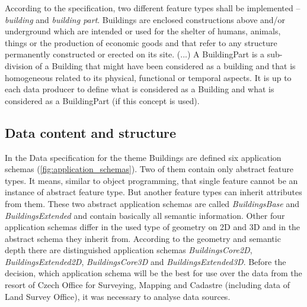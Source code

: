 \documentclass[eprint]{actapoly}
\begin{document}
According to the specification, two different feature types shall be implemented -- \textit{building} and \textit{building part}. Buildings are enclosed constructions above and/or underground which are intended or used for the shelter of humans, animals, things or the production of economic goods and that refer to any structure permanently constructed or erected on its site. (...) A BuildingPart is a sub-division of a Building that might have been considered as a building and that is homogeneous related to its physical, functional or temporal aspects. It is up to each data producer to define what is considered as a Building and what is considered as a BuildingPart (if this concept is used). \cite{Data Specification on Buildings v3.0 - http://inspire.ec.europa.eu/documents/Data_Specifications/INSPIRE_DataSpecification_BU_v3.0.pdf}

\subsection{Data content and structure}
\label{sec:content}

In the Data specification for the theme Buildings are defined six application schemas (\ref{fig:application_schemas}). Two of them contain only abstract feature types. It means, similar to object programming, that single feature cannot be an instance of abstract feature type. But another feature types can inherit attributes from them. These two abstract application schemas are called \textit{BuildingsBase} and \textit{BuildingsExtended} and contain basically all semantic information. Other four application schemas differ in the used type of geometry on 2D and 3D and in the abstract schema they inherit from. According to the geometry and semantic depth there are distinguished application schemas \textit{BuildingsCore2D}, \textit{BuildingsExtended2D}, \textit{BuildingsCore3D} and \textit{BuildingsExtended3D}. Before the decision, which application schema will be the best for use over the data from the resort of Czech Office for Surveying, Mapping and Cadastre (including data of Land Survey Office), it was necessary to analyse data sources.
\end{document}
